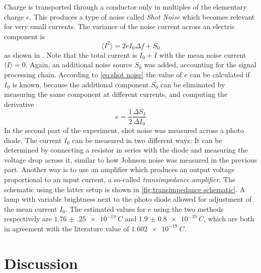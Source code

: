 \documentclass[
    parskip=half, 
    twoside=false,
    twocolumn=true,
    fontsize=11pt,
]{scrarticle}
\begin{document}
Charge is transported through a conductor only in multiples of the elementary charge $e$. This produces a type of noise called \textit{Shot Noise} which becomes relevant for very small currents. The variance of the noise current across an electric component is
\begin{equation}
    \label{eq:shot noise}
    \langle I^2 \rangle = 2 e I_0 \Delta f + S_0
\end{equation}
as shown in \autocite{Buch}. Note that the total current is $I_0 + I$ with the mean noise current $\langle I \rangle = 0$. Again, an additional noise source $S_0$ was added, accounting for the signal processing chain. According to \autoref{eq:shot noise} the value of $e$ can be calculated if $I_0$ is known, because the additional component $S_0$ can be eliminated by measuring the same component at different currents, and computing the derivative
\begin{equation}
 e = \frac{1}{2}\frac{\Delta S_I}{\Delta I_0}
\end{equation}
In the second part of the experiment, shot noise was measured across a photo diode. The current $I_0$ can be measured in two different ways: It can be determined by connecting a resistor in series with the diode and measuring the voltage drop across it, similar to how Johnson noise was measured in the previous part. Another way is to use an amplifier which produces an output voltage proportional to an input current, a so-called \textit{transimpedance amplifier}. The schematic using the latter setup is shown in \autoref{fig:transimpedance schematic}. A lamp with variable brightness next to the photo diode allowed for adjustment of the mean current $I_0$.
The estimated values for $e$ using the two methods respectively are $\SI{1.76(25)e-19}{C}$ and $\SI{1.9(08)e-19}{C}$, which are both in agreement with the literature value of $\SI{1.602e-19}{C}$.

\pagebreak
\section{Discussion}

\nocite{*}
\printbibliography
\end{document}
